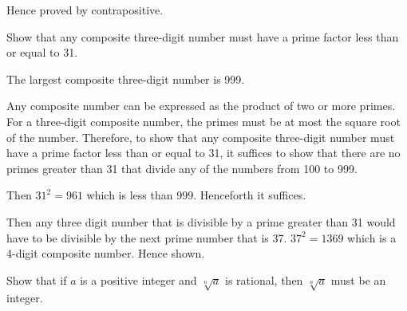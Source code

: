 \documentclass[addpoints]{exam}
\newenvironment{problem}[2][Problem]{\begin{trivlist}
    \item[\hskip \labelsep {\bfseries #1}\hskip \labelsep {\bfseries #2.}]}{\end{trivlist}}
\begin{document}
\begin{sloppypar}
\begin{questions}
\begin{solution}
            Hence proved by contrapositive.
        \end{solution}
    \end{questions}
    \pagebreak
    \begin{problem}{9}
    Show that any composite three-digit number must have a prime factor less than or equal to 31.
    \end{problem}

    \begin{questions}
        \question
        \begin{solution}
            
            The largest composite three-digit number is 999.
            
            Any composite number can be expressed as the product of two or more primes. For a three-digit composite number, the primes must be at most the square root of the number. Therefore, to show that any composite three-digit number must have a prime factor less than or equal to 31, it suffices to show that there are no primes greater than 31 that divide any of the numbers from 100 to 999.

            Then $ 31^2 = 961 $ which is less than 999. Henceforth it suffices. 

            Then any three digit number that is divisible by a prime greater than 31 would have to be divisible by the next prime number that is 37. $ 37^2 = 1369 $ which is a 4-digit composite number. Hence shown.
        \end{solution}
    \end{questions}

    \begin{problem}{10}
    Show that if $a$ is a positive integer and $\sqrt[n]{a}$ is rational, then $\sqrt[n]{a}$ must be an integer.
    \end{problem}

    \begin{questions}
        \question
        \begin{solution}
            

\end{solution}
\end{questions}
\end{sloppypar}
\end{document}
